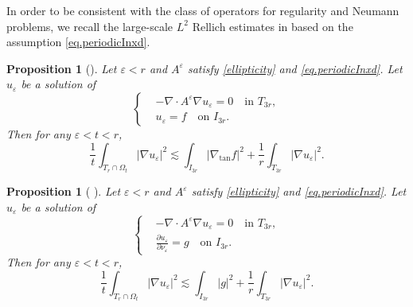 \documentclass[reqno,12pt]{amsart} %
\newtheorem{proposition}[theorem]{Proposition}
\theoremstyle{definition}
\theoremstyle{remark}
\numberwithin{equation}{section}
\newcommand{\e}{\varepsilon}
\begin{document}
In order to be consistent with the class of operators for regularity and Neumann problems, we recall the large-scale $L^2$ Rellich estimates in \cite{KS11} based on the assumption \eqref{eq.periodicInxd}.

\begin{proposition}[{\cite[Lemma 3.4]{KS11}}] \label{prop.localR2}
    Let $\e < r$ and $A^\e$ satisfy \eqref{ellipticity} and \eqref{eq.periodicInxd}. Let $u_\e$ be a solution of
        \begin{equation}\label{eq.Rp.T3r}
    \left\{
    \begin{aligned}
        & -\nabla\cdot A^\e \nabla u_\e = 0 \quad \text{in } T_{3r}, \\
        & u_\e = f  \quad \text{on } I_{3r}.
    \end{aligned}
    \right.
    \end{equation}
    Then for any $\e < t< r$,
    \begin{equation}\label{est.L2Rellich-1}
        \frac{1}{t} \int_{T_r \cap \Omega_t} |\nabla u_\e|^2 \lesssim \int_{I_{3r}} |\nabla_{\tan} f|^2  + \frac{1}{r} \int_{T_{3r}} |\nabla u_\e|^2.
    \end{equation}
\end{proposition}

\begin{proposition}[{\cite[Lemma 3.2]{KS11} }] \label{prop.localN2}
    Let $\e < r$ and $A^\e$ satisfy \eqref{ellipticity} and \eqref{eq.periodicInxd}. Let $u_\e$ be a solution of
        \begin{equation}\label{eq.Np.T3r}
    \left\{
    \begin{aligned}
        & -\nabla\cdot A^\e \nabla u_\e = 0 \quad \text{in } T_{3r}, \\
        & \frac{\partial u_\e}{\partial \nu_\e} = g \quad \text{on } I_{3r}.
    \end{aligned}
    \right.
    \end{equation}
    Then for any $\e < t< r$,
    \begin{equation}\label{est.L2Rellich-2}
        \frac{1}{t} \int_{T_r \cap \Omega_t} |\nabla u_\e|^2 \lesssim \int_{I_{3r}} |g|^2  + \frac{1}{r} \int_{T_{3r}} |\nabla u_\e|^2.
    \end{equation}
\end{proposition}
\end{document}
